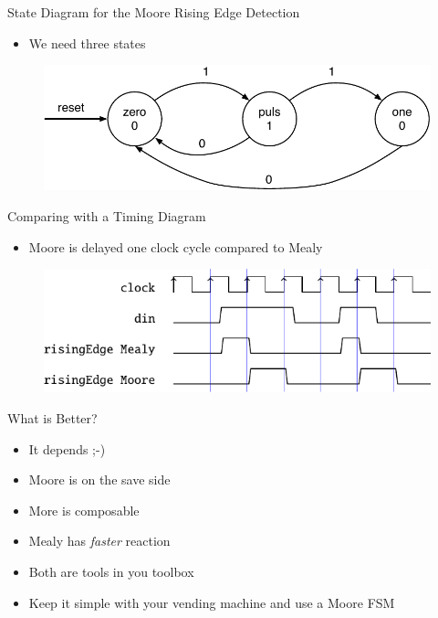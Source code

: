 \begin{frame}[fragile]{State Diagram for the Moore Rising Edge Detection}
\begin{itemize}
\item We need three states
\end{itemize}
\begin{figure}
  \includegraphics[scale=\scale]{../figures/state-diag-rising-moore}
\end{figure}
\end{frame}

\begin{frame}[fragile]{Comparing with a Timing Diagram}
\begin{itemize}
\item Moore is delayed one clock cycle compared to Mealy
\end{itemize}
\begin{figure}
  \includegraphics[scale=1]{../figures/rising}
\end{figure}
\end{frame}

\begin{frame}[fragile]{What is Better?}
\begin{itemize}
\item It depends ;-)
\item Moore is on the save side
\item More is composable
\item Mealy has \emph{faster} reaction
\item Both are tools in you toolbox
\item Keep it simple with your vending machine and use a Moore FSM
\end{itemize}
\end{frame}


